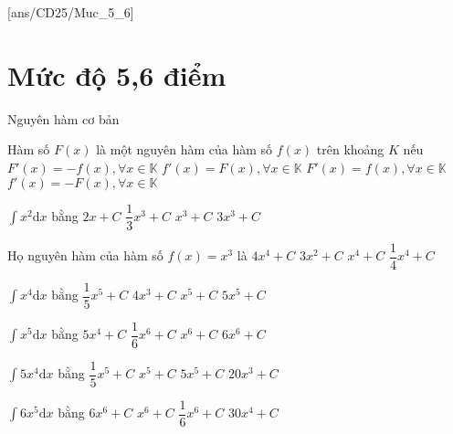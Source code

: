 [ans/CD25/Muc_5_6]
\setcounter{ex}{0}
\setcounter{dang}{0}
\section{Mức độ 5,6 điểm}
\begin{dang}
	{Nguyên hàm cơ bản}
\end{dang}
\begin{ex}
	Hàm số $F(x)$ là một nguyên hàm của hàm số $f(x)$ trên khoảng $K$ nếu
	\choice
	{$ F'(x)=-f(x),\forall x\in \mathbb{K}$}     
	{$ f'(x)=F(x),\forall x\in \mathbb{K}$}
	{\True $ F'(x)=f(x),\forall x\in \mathbb{K}$}
	{$ f'(x)=-F(x),\forall x\in \mathbb{K}$}
\end{ex}
\begin{ex}
	[Mã 101 - 2020 Lần 1]%
	$\displaystyle\int{x^2\mathrm{d}x}$ bằng
	\choice
	{$ 2x+C$}
	{\True $\dfrac{1}{3}{x^3}+C$}
	{$x^3+C$}
	{$ 3x^3+C$}
	\loigiai{}
\end{ex}
\begin{ex}
	[Mã 102 - 2020 Lần 1]%
	Họ nguyên hàm của hàm số $f(x)=x^3$ là
	\choice
	{$4 x^4+C$}
	{$3 x^2+C$}
	{$x^4+C$}
	{\True $\dfrac{1}{4}x^4+C$}
\end{ex}
\begin{ex}
	[Mã 103 - 2020 Lần 1]%
	$\displaystyle\int{x^4\mathrm{d}x}$ bằng
	\choice
	{\True $\dfrac{1}{5}{x^5}+C$}
	{$4x^3+C$}
	{$x^5+C$}
	{$5x^5+C$}
\end{ex}
\begin{ex}
	[Mã 104 - 2020 Lần 1]%
	$\displaystyle\int{x^5\mathrm{d}x}$ bằng
	\choice
	{$ 5x^4+C$}
	{\True $\dfrac{1}{6}{x^6}+C$}
	{$x^6+C$}
	{$ 6x^6+C$}
	\loigiai{}
\end{ex}
\begin{ex}
	[Mã 101 - 2020 Lần 2]%
	$\displaystyle\int{5x^4\mathrm{d}x}$ bằng
	\choice
	{$\dfrac{1}{5}{x^5}+C$}
	{\True $x^5+C$}
	{$ 5x^5+C$}
	{$ 20x^3+C$}
\end{ex}
\begin{ex}
	[Mã 102 - 2020 Lần 2]%
	$\displaystyle\int{6x^5\mathrm{d}x}$ bằng
	\choice
	{$ 6x^6+C$}
	{\True $x^6+C$}
	{$\dfrac{1}{6}{x^6}+C$}
	{$ 30x^4+C$}
\end{ex}
